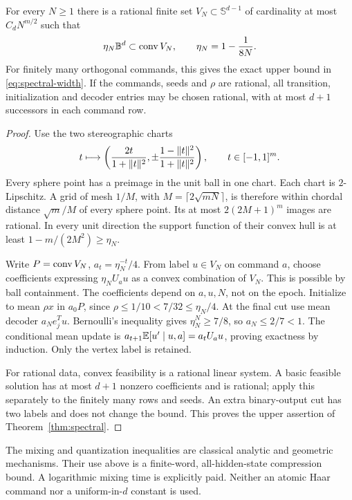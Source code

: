 \begin{lemma}\label{lem:net-upper}
For every $N\ge1$ there is a rational finite set
$V_N\subset\mathbb S^{d-1}$ of cardinality at most $C_d N^{m/2}$ such that
\[
 \eta_N\mathbb B^d\subset\operatorname{conv} V_N,\qquad \eta_N=1-\frac1{8N}.
\]
For finitely many orthogonal commands, this gives the exact upper bound
in \eqref{eq:spectral-width}. If the commands, seeds and $\rho$ are
rational, all transition, initialization and decoder entries may be
chosen rational, with at most $d+1$ successors in each command row.
\end{lemma}
\begin{proof}
Use the two stereographic charts
\[
 t\longmapsto\left(\frac{2t}{1+\lVert t\rVert^2},
             \pm\frac{1-\lVert t\rVert^2}{1+\lVert t\rVert^2}\right),
 \qquad t\in[-1,1]^m.
\]
Every sphere point has a preimage in the unit ball in one chart.
Each chart is $2$-Lipschitz. A grid of mesh $1/M$, with
$M=\lceil2\sqrt{mN}\rceil$, is therefore within chordal distance
$\sqrt m/M$ of every sphere point. Its at most $2(2M+1)^m$ images
are rational. In every unit direction the support function of their
convex hull is at least $1-m/(2M^2)\ge\eta_N$.

Write $P=\operatorname{conv} V_N$, $a_t=\eta_N^{-t}/4$. From label $u\in V_N$
on command $a$, choose coefficients expressing $\eta_NU_au$ as a
convex combination of $V_N$. This is possible by ball containment.
The coefficients depend on $a,u,N$, not on the epoch. Initialize to
mean $\rho x$ in $a_0P$, since $\rho\le1/10<7/32\le\eta_N/4$.
At the final cut use mean decoder $a_N e_j^Tu$.
Bernoulli's inequality gives $\eta_N^N\ge7/8$, so $a_N\le2/7<1$.
The conditional mean update is
$a_{t+1}\mathbb E[u'\mid u,a]=a_tU_au$, proving exactness by induction.
Only the vertex label is retained.

For rational data, convex feasibility is a rational linear system.
A basic feasible solution has at most $d+1$ nonzero coefficients and
is rational; apply this separately to the finitely many rows and seeds.
An extra binary-output cut has two labels and does not change the bound.
This proves the upper assertion of Theorem~\ref{thm:spectral}.
\end{proof}

The mixing and quantization inequalities are classical analytic and
geometric mechanisms. Their use above is a finite-word, all-hidden-state
compression bound. A logarithmic mixing time is explicitly paid. Neither
an atomic Haar command nor a uniform-in-$d$ constant is used.
